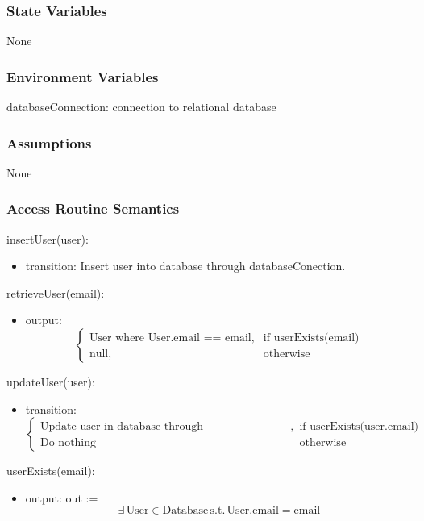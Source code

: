 \documentclass[12pt, titlepage]{article}
\begin{document}
\subsubsection{State Variables}
None
\subsubsection{Environment Variables}
databaseConnection: connection to relational database

\subsubsection{Assumptions}
None

\subsubsection{Access Routine Semantics}

\noindent insertUser(user):
\begin{itemize}
\item transition: Insert user into database through databaseConection.
\end{itemize}

\noindent retrieveUser(email):
\begin{itemize}
\item output: 
\[
\begin{cases}
    \text{User where User.email == email}, & \text{if } \text{userExists(email)}\\
    \text{null}, & \text{otherwise}
\end{cases}
\]
\end{itemize}

\noindent updateUser(user):
\begin{itemize}
\item transition: 
\[
\begin{cases}
    \text{Update user in database through databaseConection}, & \text{if } \text{userExists(user.email)}\\
    \text{Do nothing} & \text{otherwise}
\end{cases}
\]
\end{itemize}

\noindent userExists(email):
\begin{itemize}
\item output: out := 
\[ \exists \, \text{User} \in \text{Database} \, \text{s.t.} \, \text{User.email} = \text{email}
\]
\end{itemize}
\end{document}
